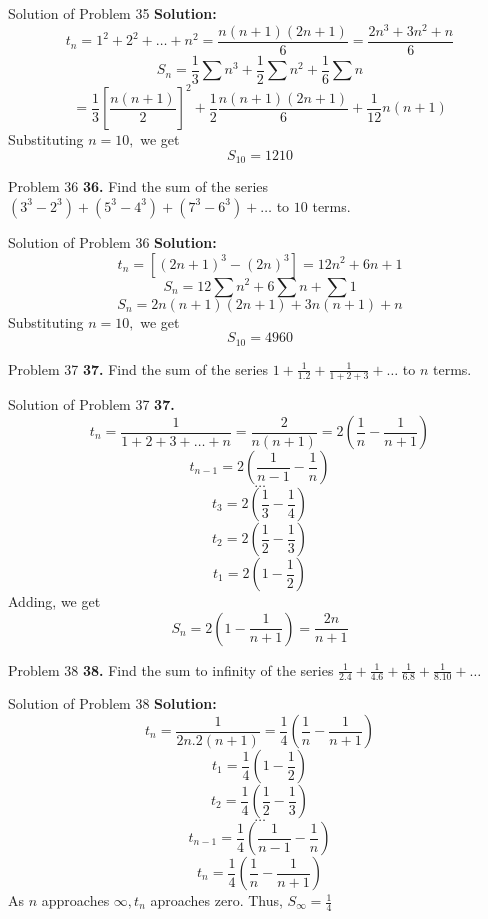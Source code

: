 \documentclass[aspectratio=1610,8pt]{beamer}
\begin{document}
\begin{frame}{Solution of Problem 35}
  \textbf{Solution:} $$t_n = 1^2 + 2^2 + \ldots + n^2 = \frac{n(n + 1)(2n + 1)}{6} = \frac{2n^3 + 3n^2 + n}{6}$$
  $$S_n = \frac{1}{3}\sum n^3 + \frac{1}{2}\sum n^2 + \frac{1}{6}\sum n$$
  $$= \frac{1}{3}\left[\frac{n(n + 1)}{2}\right]^2 + \frac{1}{2}\frac{n(n + 1)(2n + 1)}{6} + \frac{1}{12}n(n + 1)$$
  Substituting $n = 10,$ we get
  $$S_{10} = 1210$$
\end{frame}
\begin{frame}{Problem 36}
  \textbf{36.} Find the sum of the series $(3^3 - 2^3) + (5^3 - 4^3) + (7^3 - 6^3) + \ldots$ to $10$ terms.
\end{frame}
\begin{frame}{Solution of Problem 36}
  \textbf{Solution:} $$t_n = [(2n + 1)^3 - (2n)^3] = 12n^2 + 6n + 1$$
  $$S_n = 12\sum n^2 + 6\sum n + \sum 1$$
  $$S_n = 2n(n + 1)(2n + 1) + 3n(n + 1) + n$$
  Substituting $n = 10,$ we get
  $$S_{10} = 4960$$
\end{frame}
\begin{frame}{Problem 37}
  \textbf{37.} Find the sum of the series $1 + \frac{1}{1.2} + \frac{1}{1 + 2 + 3} + \ldots$ to $n$ terms.
\end{frame}
\begin{frame}{Solution of Problem 37}
  \textbf{37.} $$t_n = \frac{1}{1 + 2 + 3 + \ldots + n} = \frac{2}{n(n + 1)} = 2\left(\frac{1}{n} - \frac{1}{n + 1}\right)$$
  $$t_{n - 1} = 2\left(\frac{1}{n - 1} - \frac{1}{n}\right)$$
  $$\ldots$$
  $$t_3 = 2\left(\frac{1}{3} - \frac{1}{4}\right)$$
  $$t_2 = 2\left(\frac{1}{2} - \frac{1}{3}\right)$$
  $$t_1 = 2\left(1 - \frac{1}{2}\right)$$
  Adding, we get
  $$S_n = 2\left(1 - \frac{1}{n + 1}\right) = \frac{2n}{n + 1}$$
\end{frame}
\begin{frame}{Problem 38}
  \textbf{38.} Find the sum to infinity of the series $\frac{1}{2.4} + \frac{1}{4.6} + \frac{1}{6.8} + \frac{1}{8.10} + \ldots$
\end{frame}
\begin{frame}{Solution of Problem 38}
  \textbf{Solution:} $$t_n = \frac{1}{2n.2(n + 1)} = \frac{1}{4}\left(\frac{1}{n} - \frac{1}{n + 1}\right)$$
  $$t_1 = \frac{1}{4}\left(1 - \frac{1}{2}\right)$$
  $$t_2 = \frac{1}{4}\left(\frac{1}{2} - \frac{1}{3}\right)$$
  $$\ldots$$
  $$t_{n - 1} = \frac{1}{4}\left(\frac{1}{n - 1} - \frac{1}{n}\right)$$
  $$t_n = \frac{1}{4}\left(\frac{1}{n} - \frac{1}{n + 1}\right)$$
  As $n$ approaches $\infty, t_n$ aproaches zero.
  Thus, $S_\infty = \frac{1}{4}$
\end{frame}
\end{document}

